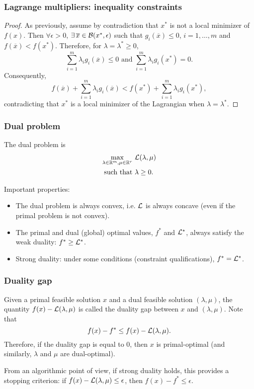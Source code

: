 \documentclass[usepdftitle=false]{beamer}
\def\blue{\color{blue}}
\begin{document}
\begin{frame}
\frametitle{Lagrange multipliers: inequality constraints}
	
\begin{proof}
	As previously, assume by contradiction that $x^*$ is not a local minimizer of $f(x)$.
Then $\forall \epsilon > 0$, $\exists\, \overline{x} \in {\mathcal{B}}(x^*, \epsilon)$ such that $g_i(\overline{x}) \leq 0$, $i = 1,\ldots,m$ and $f(\overline{x}) < f(x^*)$.
Therefore, for $\lambda = \lambda^* \geq 0$,
$$
\sum_{i = 1}^{m} \lambda_i g_i(\overline{x}) \leq 0 \mbox{ and }
\sum_{i = 1}^{m} \lambda_i g_i(x^*) = 0.
$$
Consequently,
$$
f(\overline{x}) + \sum_{i = 1}^{m} \lambda_i g_i(\overline{x}) < f(x^*) + \sum_{i = 1}^{m} \lambda_i g_i(x^*),
$$
contradicting that $x^*$ is a local minimizer of the Lagrangian when $\lambda = \lambda^*$.
\end{proof}

\end{frame}

\begin{frame}
\frametitle{Dual problem}

The dual problem is
\begin{align*}
\max_{\lambda \in {\mathbb{R}}^m, \mu \in {\mathbb{R}}^r}\ & {\mathcal{L}}(\lambda, \mu) \\
\mbox{such that } & \lambda \geq 0.
\end{align*}

Important properties:
\begin{itemize}
\item
The dual problem is always convex, i.e. ${\mathcal{L}}$ is always concave (even if the primal problem is not convex).
\item
The primal and dual (global) optimal values, $f^*$ and ${\mathcal{L}}^*$, always satisfy the weak duality: $f^* \geq {\mathcal{L}}^*$.
\item {\blue Strong duality}: under some conditions (constraint qualifications), $f^* = {\mathcal{L}}^*$.
\end{itemize}

\end{frame}

\begin{frame}
\frametitle{Duality gap}

Given a primal feasible solution $x$ and a dual feasible solution $(\lambda, \mu)$, the quantity $f(x) - {\mathcal{L}}(\lambda, \mu)$ is called the duality gap between $x$ and $(\lambda, \mu)$.
Note that
$$
f(x) - f^* \leq f(x) - {\mathcal{L}}(\lambda, \mu).
$$
Therefore, if the duality gap is equal to 0, then $x$ is primal-optimal (and similarly, $\lambda$ and $\mu$ are dual-optimal).

\mbox{}

From an algorithmic point of view, if strong duality holds, this provides a stopping criterion: if $f(x) - {\mathcal{L}}(\lambda, \mu) \leq \epsilon$, then $f(x) - f^* \leq \epsilon$.

\end{frame}
\end{document}
